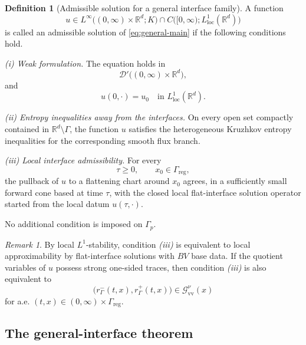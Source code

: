 \documentclass[11pt]{amsart}
\numberwithin{equation}{section}
\theoremstyle{plain}
\theoremstyle{definition}
\newtheorem{definition}[theorem]{Definition}
\theoremstyle{remark}
\newtheorem{remark}[theorem]{Remark}
\begin{document}
\begin{definition}[Admissible solution for a general interface family]
\label{def:general-admissible-solution}
A function
\[
    u
    \in
    L^\infty
    \bigl((0,\infty)\times\mathbb R^d;K\bigr)
    \cap
    C
    \bigl([0,\infty);L^1_{\mathrm{loc}}(\mathbb R^d)\bigr)
\]
is called an admissible solution of
\eqref{eq:general-main} if the following conditions hold.

\smallskip
\noindent
\emph{(i) Weak formulation.}
The equation holds in
\[
    \mathcal D'
    \bigl((0,\infty)\times\mathbb R^d\bigr),
\]
and
\[
    u(0,\cdot)=u_0
    \quad\text{in }L^1_{\mathrm{loc}}(\mathbb R^d).
\]

\smallskip
\noindent
\emph{(ii) Entropy inequalities away from the interfaces.}
On every open set compactly contained in
\(\mathbb R^d\setminus\Gamma\), the function \(u\) satisfies the
heterogeneous Kruzhkov entropy inequalities for the corresponding smooth
flux branch.

\smallskip
\noindent
\emph{(iii) Local interface admissibility.}
For every
\[
    \tau\ge0,
    \qquad
    x_0\in\Gamma_{\mathrm{reg}},
\]
the pullback of \(u\) to a flattening chart around \(x_0\) agrees, in a
sufficiently small forward cone based at time \(\tau\), with the closed local
flat-interface solution operator started from the local datum
\(u(\tau,\cdot)\).

No additional condition is imposed on \(\Gamma_p\).
\end{definition}

\begin{remark}
By local \(L^1\)-stability, condition \emph{(iii)} is equivalent to local
approximability by flat-interface solutions with \(BV\) base data. If the
quotient variables of \(u\) possess strong one-sided traces, then
condition \emph{(iii)} is also equivalent to
\[
    \bigl(
        r_\Gamma^-(t,x),
        r_\Gamma^+(t,x)
    \bigr)
    \in
    \mathcal G_{\mathrm{vv}}^\nu(x)
\]
for a.e.
\((t,x)\in(0,\infty)\times\Gamma_{\mathrm{reg}}\).
\end{remark}

\subsection{The general-interface theorem}
\label{subsec:general-main-theorem}
\end{document}
